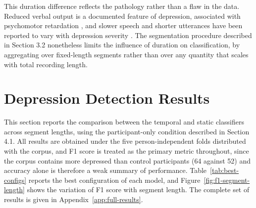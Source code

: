\documentclass{mproj}
\begin{document}
This duration difference reflects the pathology rather than a flaw in the data. Reduced verbal output is a documented feature of depression, associated with psychomotor retardation \cite{buyukdura2011}, and slower speech and shorter utterances have been reported to vary with depression severity \cite{mundt2012}. The segmentation procedure described in Section 3.2 nonetheless limits the influence of duration on classification, by aggregating over fixed-length segments rather than over any quantity that scales with total recording length.

\section{Depression Detection Results}\label{sec:detection-results}

This section reports the comparison between the temporal and static classifiers across segment lengths, using the participant-only condition described in Section 4.1. All results are obtained under the five person-independent folds distributed with the corpus, and F1 score is treated as the primary metric throughout, since the corpus contains more depressed than control participants (64 against 52) and accuracy alone is therefore a weak summary of performance. Table~\ref{tab:best-configs} reports the best configuration of each model, and Figure~\ref{fig:f1-segment-length} shows the variation of F1 score with segment length. The complete set of results is given in Appendix~\ref{app:full-results}.
\end{document}
